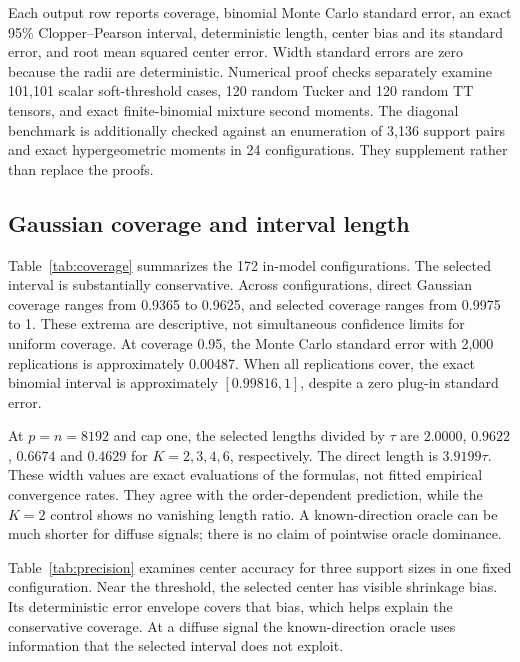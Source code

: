 \documentclass[11pt]{article}
\theoremstyle{remark}
\begin{document}
Each output row reports coverage, binomial Monte Carlo standard error, an exact 95\% Clopper--Pearson interval, deterministic length, center bias and its standard error, and root mean squared center error. Width standard errors are zero because the radii are deterministic. Numerical proof checks separately examine 101,101 scalar soft-threshold cases, 120 random Tucker and 120 random TT tensors, and exact finite-binomial mixture second moments. The diagonal benchmark is additionally checked against an enumeration of 3,136 support pairs and exact hypergeometric moments in 24 configurations. They supplement rather than replace the proofs.

\subsection{Gaussian coverage and interval length}
Table~\ref{tab:coverage} summarizes the 172 in-model configurations. The selected interval is substantially conservative. Across configurations, direct Gaussian coverage ranges from 0.9365 to 0.9625, and selected coverage ranges from 0.9975 to 1. These extrema are descriptive, not simultaneous confidence limits for uniform coverage. At coverage 0.95, the Monte Carlo standard error with 2,000 replications is approximately 0.00487. When all replications cover, the exact binomial interval is approximately $[0.99816,1]$, despite a zero plug-in standard error.

\begin{table}[ht]
\centering

\caption{Coverage extrema over the stated Gaussian configurations. The oracle is evaluated only for nonzero rank-one signals, giving fewer configurations and a different information set. Each configuration has 2,000 replications; configuration-level uncertainty is retained in the accompanying CSV.}
\label{tab:coverage}
\end{table}

At $p=n=8192$ and cap one, the selected lengths divided by $\tau$ are $2.0000$, $0.9622$, $0.6674$ and $0.4629$ for $K=2,3,4,6$, respectively. The direct length is $3.9199\tau$. These width values are exact evaluations of the formulas, not fitted empirical convergence rates. They agree with the order-dependent prediction, while the $K=2$ control shows no vanishing length ratio. A known-direction oracle can be much shorter for diffuse signals; there is no claim of pointwise oracle dominance.

Table~\ref{tab:precision} examines center accuracy for three support sizes in one fixed configuration. Near the threshold, the selected center has visible shrinkage bias. Its deterministic error envelope covers that bias, which helps explain the conservative coverage. At a diffuse signal the known-direction oracle uses information that the selected interval does not exploit.
\end{document}
